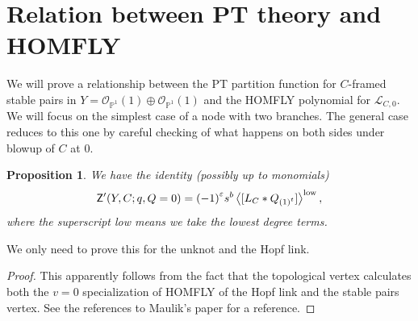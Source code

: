 \documentclass{amsart}
\newtheorem{prop}[thm]{Proposition}
\theoremstyle{definition}
\theoremstyle{remark}
\theoremstyle{plain}
\theoremstyle{definition}
\theoremstyle{remark}
\renewcommand{\P}{\mathbb{P}}
\newcommand{\ep}{\varepsilon}
\newcommand{\mc}[1]{\mathcal{#1}}
\newcommand{\mr}[1]{\mathrm{#1}}
\newcommand{\ms}[1]{\mathsf{#1}}
\newcommand{\1}{\mathbf{1}}
\newcommand{\2}{\mathbf{2}}
\newcommand{\3}{\mathbf{3}}
\begin{document}
\section{Relation between PT theory and HOMFLY}%
\label{sec:relation_between_pt_theory_and_homfly}

We will prove a relationship between the PT partition function for $C$-framed stable pairs in $Y = \mc{O}_{\P^1}(1) \oplus \mc{O}_{\P^1}(1)$ and the HOMFLY polynomial for $\mc{L}_{C,0}$. We will focus on the simplest case of a node with two branches. The general case reduces to this one by careful checking of what happens on both sides under blowup of $C$ at $0$.

\begin{prop}
    We have the identity (possibly up to monomials)
    \[ \ms{Z}'(Y, C; q, Q=0) = {(-1)}^{\ep} s^b \ev{[L_C * Q_{{(1)}^t}]}^{\mr{low}}, \]
    where the superscript low means we take the lowest degree terms.
\end{prop}

We only need to prove this for the unknot and the Hopf link.

\begin{proof}
    This apparently follows from the fact that the topological vertex calculates both the $v=0$ specialization of HOMFLY of the Hopf link and the stable pairs vertex. See the references to Maulik's paper for a reference.
\end{proof}
\end{document}
